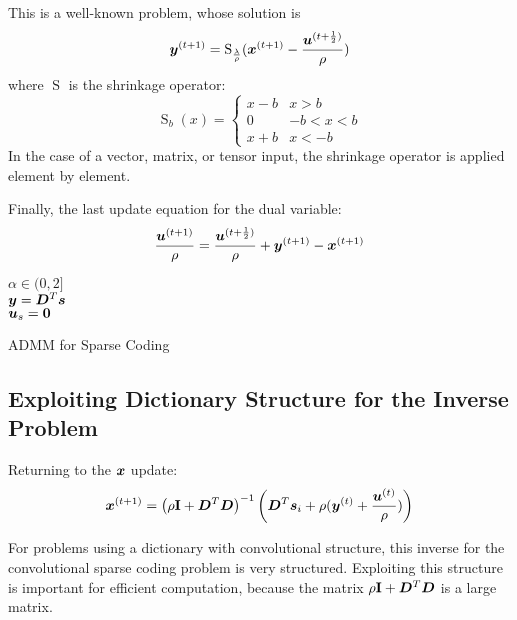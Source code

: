 This is a well-known problem, whose solution is
\begin{equation}
\bm{y}^{(t + 1)} = \operatorname{S}_{\frac{\lambda}{\rho}}(\bm{x}^{(t + 1)} - \frac{\bm{u}^{(t + \frac{1}{2})}}{\rho})
\end{equation}
where $\operatorname{S}$ is the shrinkage operator:
\begin{equation}
\operatorname{S}_{b}(x) = \begin{cases} x - b & x > b \\ 0 & -b < x < b \\ x + b & x < - b \end{cases}
\end{equation}
In the case of a vector, matrix, or tensor input, the shrinkage operator is applied element by element.

Finally, the last update equation for the dual variable:
\begin{equation}
\frac{\bm{u}^{(t + 1)}}{\rho} = \frac{\bm{u}^{(t + \frac{1}{2})}}{\rho} + \bm{y}^{(t + 1)} - \bm{x}^{(t + 1)}
\end{equation}

\begin{algorithm}[H]
\SetAlgoLined
   $\alpha \in (0,2]$ \\
   $\bm{y} = \bm{D}^T\bm{s}$ \\
   $\bm{u}_s = \bm{0}$ \\
 \caption{ADMM for Sparse Coding}
\end{algorithm}

\subsection{Exploiting Dictionary Structure for the Inverse Problem}
\label{subsection:SC xupdate}
Returning to the $\bm{x}$ update:
\begin{equation}
\bm{x}^{(t + 1)} = \left(\rho{\bf I} + \bm{D}^T\bm{D}\right)^{-1}\left(\bm{D}^T\bm{s}_i + \rho(\bm{y}^{(t)} + \frac{\bm{u}^{(t)}}{\rho})\right)
\end{equation}

For problems using a dictionary with convolutional structure, this inverse for the convolutional sparse coding problem is very structured. Exploiting this structure is important for efficient computation, because the matrix $\rho{\bf I} + \bm{D}^T\bm{D}$ is a large matrix.

